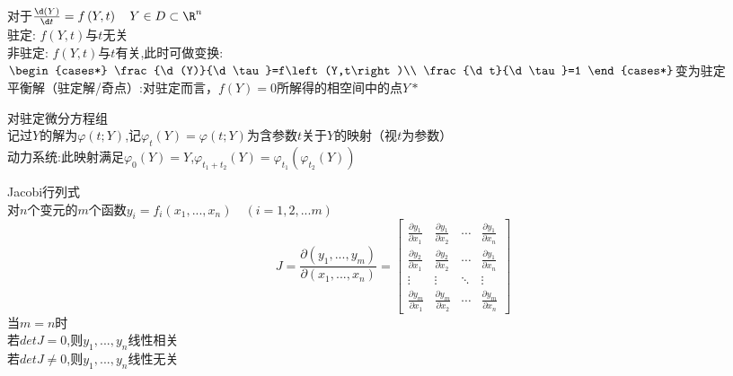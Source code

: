 \begin{dingyi}对于$\frac{\d (Y)}{\d t}=f\left(Y,t\right)\quad Y\in D\subset \R^n$\\
    驻定: $f\left(Y,t\right)$与$t$无关\\
    非驻定: $f\left(Y,t\right)$与$t$有关,此时可做变换:
    $\begin{cases*} \frac{\d (Y)}{\d \tau}=f\left(Y,t\right)\\ \frac{\d t}{\d \tau}=1 \end{cases*}$变为驻定\\
    平衡解（驻定解/奇点）:对驻定而言，$f(Y)=0$所解得的相空间中的点$Y*$
\end{dingyi}

\begin{dingyi}对驻定微分方程组\\
    记过$Y$的解为$\varphi(t;Y)$,记$\varphi_t(Y)=\varphi(t;Y)$为含参数$t$关于$Y$的映射（视$t$为参数）\\
    动力系统:此映射满足$\varphi_0(Y)=Y$,$\varphi_{t_1+t_2}(Y)=\varphi_{t_1}(\varphi_{t_2}(Y))$
\end{dingyi}

\begin{dingyi}Jacobi行列式\\
    对$n$个变元的$m$个函数$y_i=f_i(x_1,...,x_n)\quad (i=1,2,...m)$\\
    \[J=\frac{\partial (y_1,...,y_m)}{\partial (x_1,...,x_n)}=
    \begin{bmatrix*}
        \frac{\partial y_1}{\partial x_1}&\frac{\partial y_1}{\partial x_2}&\cdots&\frac{\partial y_1}{\partial x_n}\\
        \frac{\partial y_2}{\partial x_1}&\frac{\partial y_2}{\partial x_2}&\cdots&\frac{\partial y_1}{\partial x_n}\\
        \vdots&\vdots&\ddots&\vdots\\
        \frac{\partial y_m}{\partial x_1}&\frac{\partial y_m}{\partial x_2}&\cdots&\frac{\partial y_m}{\partial x_n}
    \end{bmatrix*}\]
    当$m=n$时\\若$det J=0$,则$y_1,...,y_n$线性相关\\ 若$det J\neq 0$,则$y_1,...,y_n$线性无关
\end{dingyi}

